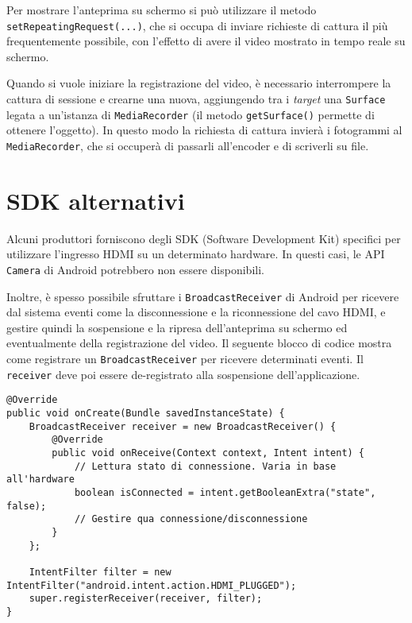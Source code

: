 Per mostrare l'anteprima su schermo si può utilizzare il metodo \texttt{setRepeatingRequest(...)}, che si occupa di inviare richieste di cattura il più frequentemente possibile, con l'effetto di avere il video mostrato in tempo reale su schermo.

Quando si vuole iniziare la registrazione del video, è necessario interrompere la cattura di sessione e crearne una nuova, aggiungendo tra i \emph{target} una \texttt{Surface} legata a un'istanza di \texttt{MediaRecorder} (il metodo \texttt{getSurface()} permette di ottenere l'oggetto). In questo modo la richiesta di cattura invierà i fotogrammi al \texttt{MediaRecorder}, che si occuperà di passarli all'encoder e di scriverli su file.

\section{SDK alternativi}
\label{sec:hdmi_sdk}

Alcuni produttori forniscono degli SDK (Software Development Kit) specifici per utilizzare l'ingresso HDMI su un determinato hardware. In questi casi, le API \texttt{Camera} di Android potrebbero non essere disponibili.

Inoltre, è spesso possibile sfruttare i \texttt{BroadcastReceiver} di Android per ricevere dal sistema eventi come la disconnessione e la riconnessione del cavo HDMI, e gestire quindi la sospensione e la ripresa dell'anteprima su schermo ed eventualmente della registrazione del video. Il seguente blocco di codice mostra come registrare un \texttt{BroadcastReceiver} per ricevere determinati eventi. Il \texttt{receiver} deve poi essere de-registrato alla sospensione dell'applicazione.


\begin{verbatim}
@Override
public void onCreate(Bundle savedInstanceState) {
    BroadcastReceiver receiver = new BroadcastReceiver() {
        @Override
        public void onReceive(Context context, Intent intent) {
            // Lettura stato di connessione. Varia in base all'hardware
            boolean isConnected = intent.getBooleanExtra("state", false);
            // Gestire qua connessione/disconnessione
        }
    };
    
    IntentFilter filter = new IntentFilter("android.intent.action.HDMI_PLUGGED");
    super.registerReceiver(receiver, filter);
}
\end{verbatim}

